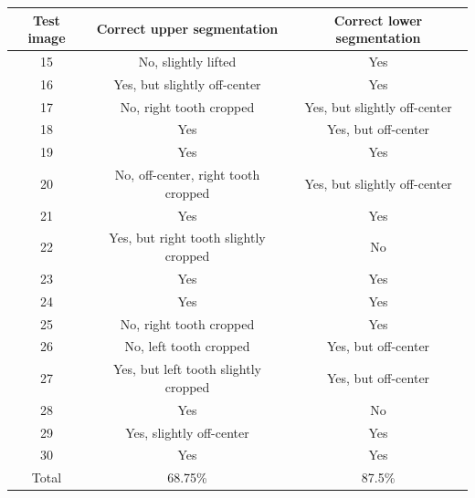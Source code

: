 \documentclass[a4paper,11pt,twoside]{article}
\begin{document}
\begin{table}[H]
\begin{center}
\begin{tabular}{|c| c| c |}
\hline
\textbf{Test image} & \textbf{Correct upper segmentation}  & \textbf{Correct lower segmentation}  \\ \hline
15 &  No, slightly lifted & Yes   \\
16 & Yes, but slightly off-center  & Yes \\ 
17 & No, right tooth cropped & Yes, but slightly off-center   \\ 
18 & Yes  & Yes, but off-center   \\  
19 & Yes & Yes   \\ 
20 & No, off-center, right tooth cropped & Yes, but slightly off-center   \\ 
21 & Yes & Yes   \\ 
22 & Yes, but right tooth slightly cropped & No   \\ 
23 & Yes & Yes   \\ 
24 & Yes & Yes   \\ 
25 & No, right tooth cropped & Yes   \\ 
26 & No, left tooth cropped & Yes, but off-center   \\ 
27 & Yes, but left tooth slightly cropped & Yes, but off-center   \\ 
28 & Yes & No   \\ 
29 & Yes, slightly off-center & Yes   \\ 
30 & Yes & Yes   \\ \hline 
Total & 68.75\% & 87.5\%  \\
\hline
\end{tabular}
\label{table1}
\end{center}
\end{table}
\end{document}
